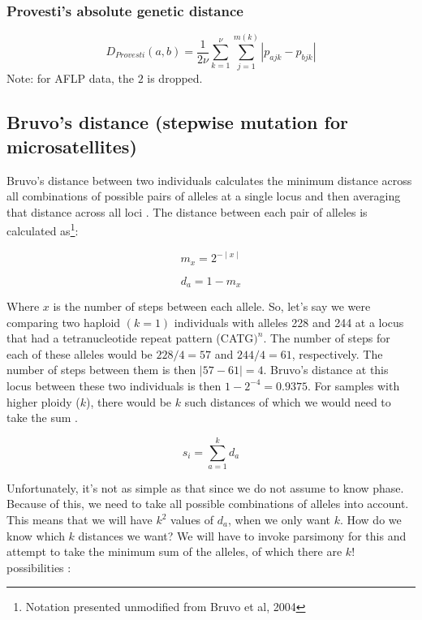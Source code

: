 \documentclass[letterpaper]{article}\usepackage[]{graphicx}\usepackage[]{color}
\begin{document}
\subsubsection{Provesti's absolute genetic distance}
\label{distance:provesti}
\begin{equation}
  D_{Provesti}(a,b)=\frac{1}{2{\nu}} \sum_{k=1}^{\nu} \sum_{j=1}^{m(k)}
  |p_{ajk} - p_{bjk}|
\end{equation}
Note: for AFLP data, the $2$ is dropped. 

\subsection{Bruvo's distance (stepwise mutation for microsatellites)}
\label{bruvo}

Bruvo's distance between two individuals calculates the minimum distance across
all combinations of possible pairs of alleles at a single locus and then
averaging that distance across all loci \cite{Bruvo:2004}. The distance between
each pair of alleles is calculated as\footnote{Notation presented unmodified
from Bruvo et al, 2004}\cite{Bruvo:2004}:

\begin{equation}
\label{eq:m_x}
m_x = 2^{-\mid x \mid}
\end{equation}

\begin{equation}
\label{eq:d_a}
d_a = 1 - m_x
\end{equation}

Where $x$ is the number of steps between each allele. So, let's say we were
comparing two haploid $(k = 1)$ individuals with alleles 228 and 244 at a locus
that had a tetranucleotide repeat pattern (CATG$)^n$. The number of steps for
each of these alleles would be $228/4 = 57$ and $244/4 =61$, respectively. The
number of steps between them is then $\mid 57 - 61 \mid = 4$. Bruvo's distance
at this locus between these two individuals is then $1-2^{-4} = 0.9375$. For
samples with higher ploidy ($k$), there would be $k$ such distances of which we
would need to take the sum \cite{Bruvo:2004}.

\begin{equation}
\label{eq:s_i}
s_i = \displaystyle \sum_{a=1}^{k} d_a
\end{equation}

Unfortunately, it's not as simple as that since we do not assume to know phase.
Because of this, we need to take all possible combinations of alleles into
account. This means that we will have $k^2$ values of $d_a$, when we only want
$k$. How do we know which $k$ distances we want? We will have to invoke
parsimony for this and attempt to take the minimum sum of the alleles, of which
there are $k!$ possibilities \cite{Bruvo:2004}:
\end{document}
